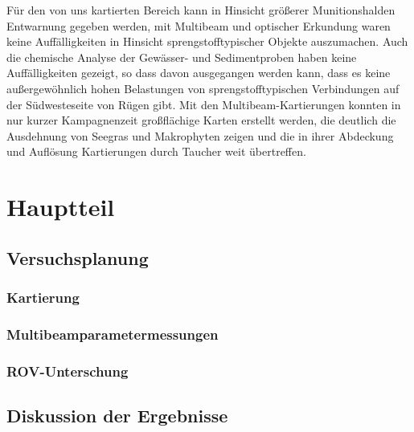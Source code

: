 \documentclass[12pt,titlepage]{scrreprt}
\begin{document}
Für den von uns kartierten Bereich kann in Hinsicht größerer Munitionshalden Entwarnung gegeben werden, mit Multibeam und optischer Erkundung waren keine Auffälligkeiten in Hinsicht sprengstofftypischer Objekte auszumachen. Auch die chemische Analyse der Gewässer- und Sedimentproben haben keine Auffälligkeiten gezeigt, so dass davon ausgegangen werden kann, dass es keine außergewöhnlich hohen Belastungen von sprengstofftypischen Verbindungen auf der Südwesteseite von Rügen gibt. Mit den Multibeam-Kartierungen konnten in nur kurzer Kampagnenzeit  großflächige Karten erstellt werden, die deutlich die Ausdehnung von Seegras und Makrophyten zeigen und die in ihrer Abdeckung und Auflösung Kartierungen durch Taucher weit übertreffen.

\tableofcontents

\chapter{Hauptteil}
\section{Versuchsplanung}
\subsection{Kartierung}

%
\subsection{Multibeamparametermessungen}

\subsection{ROV-Unterschung}


\section{Diskussion der Ergebnisse}






\end{document}
